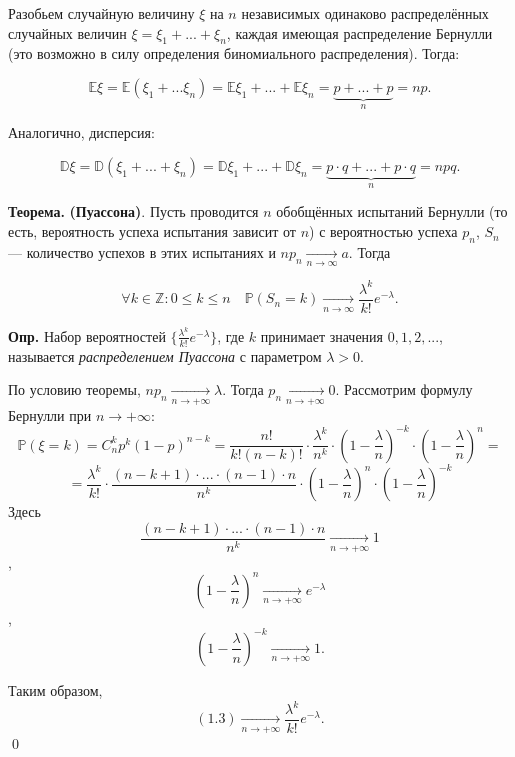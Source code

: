 \documentclass[oneside,final,14pt]{extreport}
\newcommand\mydef{{\bf Опр.}}
\newcommand\myth{{\bf Теорема.}}
\renewenvironment{proof}{{\bfseries Доказательство.}}{\qed}
\theoremstyle{definition}
\begin{document}
Разобьем случайную величину $\xi$ на $n$ независимых одинаково распределённых случайных величин $\xi = \xi_1 + ... + \xi_n$, каждая имеющая распределение Бернулли (это возможно в силу определения биномиального распределения). Тогда:

$$\mathbb{E}\xi = \mathbb{E}(\xi_1 + ... \xi_n) = \mathbb{E}\xi_1 + ... + \mathbb{E}\xi_n = \underbrace{p + ... + p}_{n} = np.$$

Аналогично, дисперсия:

$$ \mathbb{D}\xi = \mathbb{D}(\xi_1 + ... + \xi_n) = \mathbb{D}\xi_1 + ... + \mathbb{D}\xi_n = \underbrace{p \cdot q + ... + p \cdot q}_{n} = npq.$$ 

\myth {} \textbf{(Пуассона)}. Пусть проводится $n$ обобщённых испытаний Бернулли
(то есть, вероятность успеха испытания зависит от $n$) с вероятностью успеха
$p_n$, $S_n$ — количество успехов в этих испытаниях и $n p_{n} \underset{n \to \infty}{\longrightarrow} a$. Тогда

$$\forall k \in \mathbb{Z}: 0 \leqslant k \leqslant n \quad \mathbb{P}\left(S_{n}=k\right) \underset{n \to \infty}{\longrightarrow} \frac{\lambda^{k}}{k !} e^{-\lambda}.$$

\mydef{} Набор вероятностей $\{ \frac{\lambda^k}{k!} e^{-\lambda} \}$, где $k$ принимает значения $0, 1, 2, ...$, называется {\it распределением Пуассона} с параметром $\lambda > 0$.

\begin{proof}
    По условию теоремы, $n p_n \xrightarrow[n \rightarrow +\infty]{} \lambda$. Тогда $p_n \xrightarrow[n \rightarrow +\infty]{} 0$. Рассмотрим формулу Бернулли при $n \rightarrow +\infty$:
    $$ \mathbb{P}(\xi = k) = C_n^k p^k (1 - p)^{n-k} = \frac{n!}{k!(n - k)!} \cdot \frac{\lambda^k}{n^k} \cdot \left(1 - \frac{\lambda}{n}\right)^{-k} \cdot \left(1 - \frac{\lambda}{n}\right)^n = $$ 
    \begin{equation}
    = \frac{\lambda^k}{k!} \cdot \frac{(n - k + 1) \cdot ... \cdot (n - 1) \cdot n}{n^k} \cdot \left( 1 - \frac{\lambda}{n}\right)^n \cdot \left(1 - \frac{\lambda}{n}\right)^{-k} 
    \end{equation}
    Здесь $$\frac{(n - k + 1) \cdot ... \cdot (n - 1) \cdot n}{n^k} \xrightarrow[n \rightarrow +\infty]{} 1$$, $$\left( 1 - \frac{\lambda}{n}\right)^n \xrightarrow[n \rightarrow +\infty]{} e^{-\lambda}$$, $$\left(1 - \frac{\lambda}{n}\right)^{-k} \xrightarrow[n \rightarrow +\infty]{} 1.$$ 
    
    Таким образом, 
    $$ (1.3) \xrightarrow[n \rightarrow +\infty]{} \frac{\lambda^k}{k!} e^{-\lambda}.$$
\end{proof}
\end{document}
